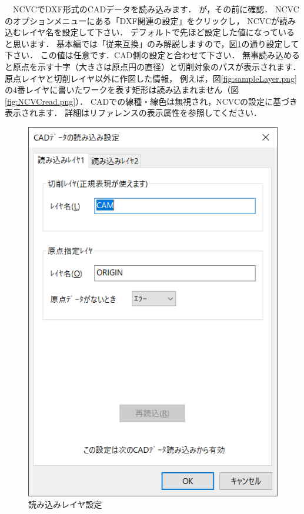 \begin{minipage}[t]{0.5\textwidth}
　NCVCでDXF形式のCADデータを読み込みます．
が，その前に確認．
NCVCのオプションメニューにある「DXF関連の設定」をクリックし，
NCVCが読み込むレイヤ名を設定して下さい．
デフォルトで先ほど設定した値になっていると思います．
基本編では「従来互換」のみ解説しますので，図\ref{fig:NCVCsetup.png}の通り設定して下さい．
この値は任意です．CAD側の設定と合わせて下さい．
無事読み込めると原点を示す十字（大きさは原点円の直径）と切削対象のパスが表示されます．
原点レイヤと切削レイヤ以外に作図した情報，
例えば，図\ref{fig:sampleLayer.png}の4番レイヤに書いたワークを表す矩形は読み込まれません（図\ref{fig:NCVCread.png}）．
CADでの線種・線色は無視され，NCVCの設定に基づき表示されます．
詳細はリファレンスの表示属性を参照してください．
\end{minipage}
\begin{minipage}[t]{0.5\textwidth}
\vspace*{-2zh}
\begin{figure}[H]
\centering
\includegraphics[scale=0.8]{No1/fig/NCVCsetup.png}
\caption{読み込みレイヤ設定}
\label{fig:NCVCsetup.png}
\end{figure}
\end{minipage}

